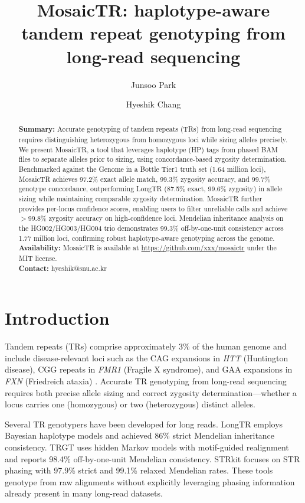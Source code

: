 \documentclass[12pt]{article}
\title{MosaicTR: haplotype-aware tandem repeat genotyping from long-read sequencing}
\author[1]{Junsoo Park}
\author[1]{Hyeshik Chang}
\affil[1]{School of Biological Sciences, Seoul National University, Seoul 08826, Republic of Korea}
\date{}
\begin{document}
\maketitle

\begin{abstract}
\noindent
\textbf{Summary:}
Accurate genotyping of tandem repeats (TRs) from long-read sequencing requires distinguishing heterozygous from homozygous loci while sizing alleles precisely.
We present MosaicTR, a tool that leverages haplotype (HP) tags from phased BAM files to separate alleles prior to sizing, using concordance-based zygosity determination.
Benchmarked against the Genome in a Bottle Tier1 truth set (1.64 million loci), MosaicTR achieves 97.2\% exact allele match, 99.3\% zygosity accuracy, and 99.7\% genotype concordance, outperforming LongTR (87.5\% exact, 99.6\% zygosity) in allele sizing while maintaining comparable zygosity determination.
MosaicTR further provides per-locus confidence scores, enabling users to filter unreliable calls and achieve $>$99.8\% zygosity accuracy on high-confidence loci.
Mendelian inheritance analysis on the HG002/HG003/HG004 trio demonstrates 99.3\% off-by-one-unit consistency across 1.77 million loci, confirming robust haplotype-aware genotyping across the genome.
\\[6pt]
\textbf{Availability:}
MosaicTR is available at \url{https://github.com/xxx/mosaictr} under the MIT license.
\\[6pt]
\textbf{Contact:} hyeshik@snu.ac.kr
\end{abstract}

\section*{Introduction}

Tandem repeats (TRs) comprise approximately 3\% of the human genome and include disease-relevant loci such as the CAG expansions in \textit{HTT} (Huntington disease), CGG repeats in \textit{FMR1} (Fragile X syndrome), and GAA expansions in \textit{FXN} (Friedreich ataxia) \citep{depienne2021,gall-duncan2019}.
Accurate TR genotyping from long-read sequencing requires both precise allele sizing and correct zygosity determination---whether a locus carries one (homozygous) or two (heterozygous) distinct alleles.

Several TR genotypers have been developed for long reads.
LongTR \citep{ziaei-jam2024} employs Bayesian haplotype models and achieved 86\% strict Mendelian inheritance consistency.
TRGT \citep{dolzhenko2024} uses hidden Markov models with motif-guided realignment and reports 98.4\% off-by-one-unit Mendelian consistency.
STRkit \citep{liu2024strkit} focuses on STR phasing with 97.9\% strict and 99.1\% relaxed Mendelian rates.
These tools genotype from raw alignments without explicitly leveraging phasing information already present in many long-read datasets.
\end{document}
